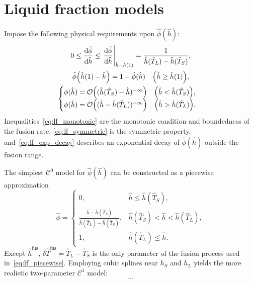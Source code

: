 \documentclass{article}
\newcommand{\fusion}[1]{{#1}^\mathrm{fus}}
\begin{document}
\section{Liquid fraction models}

Impose the following physical requirements upon \(\hat\phi(\hat{h})\):
\begin{gather}
    0 \leq \dv{\hat\phi}{\hat{h}} \leq \eval{\dv{\hat\phi}{\hat{h}}}_{\hat{h}=\hat{h}(1)} =
        \frac1{\hat{h}(\hat{T}_L)-\hat{h}(\hat{T}_S)}, \label{eq:lf_monotonic}\\
    \hat\phi\qty(\hat{h}(1) - \hat{h}) = 1 - \hat\phi(\hat{h}) \quad \qty(\hat{h}\geq\hat{h}(1)), \label{eq:lf_symmetric}\\
    \begin{cases}
	\phi(\hat{h}) = \order{(\hat{h}(\hat{T}_S)-\hat{h})^{-\infty}} \quad \qty(\hat{h} < \hat{h}(\hat{T}_S)), \\
	    \phi(\hat{h}) = \order{(\hat{h}-\hat{h}(\hat{T}_L))^{-\infty}} \quad \qty(\hat{h} > \hat{h}(\hat{T}_L)).
	\end{cases}\label{eq:lf_exp_decay}
\end{gather}
Inequalities~\eqref{eq:lf_monotonic} are the monotonic condition and boundedness of the fusion rate,
\eqref{eq:lf_symmetric} is the symmetric property,
and~\eqref{eq:lf_exp_decay} describes an exponential decay of \(\hat\phi(\hat{h})\) outside the fusion range.

The simplest \(\mathcal{C}^0\) model for \(\hat{\phi}(\hat{h})\) can be constructed as a piecewise approximation
\begin{equation}\label{eq:lf_piecewise}
	\hat{\phi} = \begin{cases}
        0,                                           & \hat{h} \leq \hat{h}(\hat{T}_S), \\
        \frac{\hat{h}-\hat{h}(\hat{T}_S)}
            {\hat{h}(\hat{T}_L)-\hat{h}(\hat{T}_S)}, & \hat{h}(\hat{T}_S) < \hat{h} < \hat{h}(\hat{T}_L), \\
        1,                                           & \hat{h}(\hat{T}_L) \leq \hat{h}.
    \end{cases}
\end{equation}
Except \(\fusion{\hat{h}}\), \(\delta\fusion{\hat{T}} = \hat{T}_L - \hat{T}_S\)
is the only parameter of the fusion process  used in~\eqref{eq:lf_piecewise}.
Employing cubic splines near \(h_S\) and \(h_L\) yields the more realistic two-parameter \(\mathcal{C}^1\) model:
\begin{equation}\label{eq:lf_splines}
	\dots
\end{equation}
\end{document}
